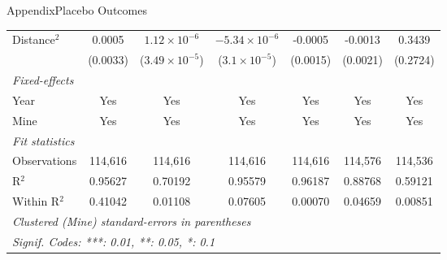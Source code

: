 \documentclass[aspectratio=169,11pt,dvipsnames, handout]{beamer}
\begin{document}
\begin{frame}{\textcolor{defaultclr!30}{Appendix}\hspace{0.75em}Placebo Outcomes}
\begin{adjustbox}{width = \textwidth, center}
\begin{tabular}{lcccccc}
      Distance$^2$                      & 0.0005         & $1.12\times 10^{-6}$    & $-5.34\times 10^{-6}$   & -0.0005              & -0.0013               & 0.3439\\   
                                        & (0.0033)       & ($3.49\times 10^{-5}$)  & ($3.1\times 10^{-5}$)   & (0.0015)             & (0.0021)              & (0.2724)\\   
      \midrule
      \emph{Fixed-effects}\\
      Year                              & Yes            & Yes                     & Yes                     & Yes                  & Yes                   & Yes\\  
      Mine                              & Yes            & Yes                     & Yes                     & Yes                  & Yes                   & Yes\\  
      \midrule
      \emph{Fit statistics}\\
      Observations                      & 114,616        & 114,616                 & 114,616                 & 114,616              & 114,576               & 114,536\\  
      R$^2$                             & 0.95627        & 0.70192                 & 0.95579                 & 0.96187              & 0.88768               & 0.59121\\  
      Within R$^2$                      & 0.41042        & 0.01108                 & 0.07605                 & 0.00070              & 0.04659               & 0.00851\\  
      \midrule \midrule
      \multicolumn{7}{l}{\emph{Clustered (Mine) standard-errors in parentheses}}\\
      \multicolumn{7}{l}{\emph{Signif. Codes: ***: 0.01, **: 0.05, *: 0.1}}\\
   \end{tabular}
   \end{adjustbox}

 \centering\hyperlink{frame:robust}{} 
    
\end{frame}



\end{document}
